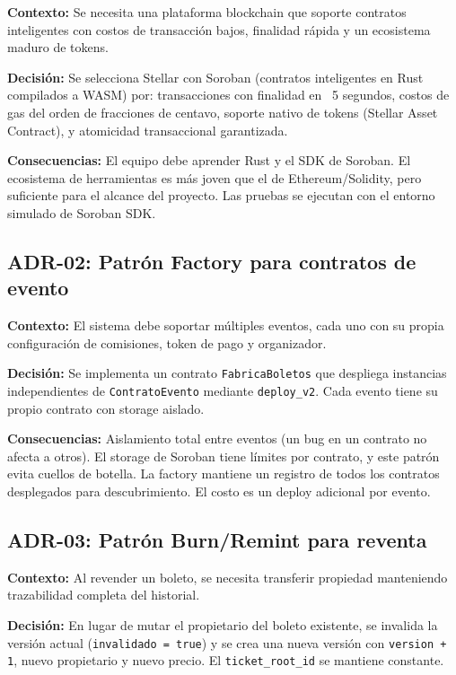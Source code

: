 \documentclass[12pt,oneside]{article}
\begin{document}
\textbf{Contexto:} Se necesita una plataforma blockchain que soporte contratos inteligentes con costos de transacción bajos, finalidad rápida y un ecosistema maduro de tokens.

\textbf{Decisión:} Se selecciona Stellar con Soroban (contratos inteligentes en Rust compilados a WASM) por: transacciones con finalidad en ~5 segundos, costos de gas del orden de fracciones de centavo, soporte nativo de tokens (Stellar Asset Contract), y atomicidad transaccional garantizada.

\textbf{Consecuencias:} El equipo debe aprender Rust y el SDK de Soroban. El ecosistema de herramientas es más joven que el de Ethereum/Solidity, pero suficiente para el alcance del proyecto. Las pruebas se ejecutan con el entorno simulado de Soroban SDK.

\subsection{ADR-02: Patrón Factory para contratos de evento}

\textbf{Contexto:} El sistema debe soportar múltiples eventos, cada uno con su propia configuración de comisiones, token de pago y organizador.

\textbf{Decisión:} Se implementa un contrato \texttt{FabricaBoletos} que despliega instancias independientes de \texttt{ContratoEvento} mediante \texttt{deploy\_v2}. Cada evento tiene su propio contrato con storage aislado.

\textbf{Consecuencias:} Aislamiento total entre eventos (un bug en un contrato no afecta a otros). El storage de Soroban tiene límites por contrato, y este patrón evita cuellos de botella. La factory mantiene un registro de todos los contratos desplegados para descubrimiento. El costo es un deploy adicional por evento.

\subsection{ADR-03: Patrón Burn/Remint para reventa}

\textbf{Contexto:} Al revender un boleto, se necesita transferir propiedad manteniendo trazabilidad completa del historial.

\textbf{Decisión:} En lugar de mutar el propietario del boleto existente, se invalida la versión actual (\texttt{invalidado = true}) y se crea una nueva versión con \texttt{version + 1}, nuevo propietario y nuevo precio. El \texttt{ticket\_root\_id} se mantiene constante.
\end{document}
